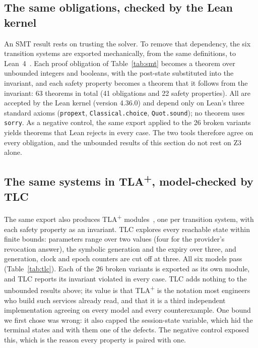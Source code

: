 \documentclass[11pt]{article}
\begin{document}
\subsection{The same obligations, checked by the Lean kernel}
\label{sec:lean}
An SMT result rests on trusting the solver. To remove that dependency, the six transition systems are exported mechanically, from the same definitions, to Lean~4~\cite{lean4}. Each proof obligation of Table~\ref{tab:smt} becomes a theorem over unbounded integers and booleans, with the post-state substituted into the invariant, and each safety property becomes a theorem that it follows from the invariant: 63 theorems in total (41 obligations and 22 safety properties). All are accepted by the Lean kernel (version 4.36.0) and depend only on Lean's three standard axioms (\texttt{propext}, \texttt{Classical.choice}, \texttt{Quot.sound}); no theorem uses \texttt{sorry}. As a negative control, the same export applied to the 26 broken variants yields theorems that Lean rejects in every case. The two tools therefore agree on every obligation, and the unbounded results of this section do not rest on Z3 alone.

\subsection{The same systems in \texorpdfstring{TLA\textsuperscript{+}}{TLA+}, model-checked by TLC}
\label{sec:tla}
The same export also produces TLA\textsuperscript{+} modules~\cite{tla}, one per transition system, with each safety property as an invariant. TLC explores every reachable state within finite bounds: parameters range over two values (four for the provider's revocation answer), the symbolic generation and the expiry over three, and generation, clock and epoch counters are cut off at three. All six models pass (Table~\ref{tab:tlc}). Each of the 26 broken variants is exported as its own module, and TLC reports its invariant violated in every case. TLC adds nothing to the unbounded results above; its value is that TLA\textsuperscript{+} is the notation most engineers who build such services already read, and that it is a third independent implementation agreeing on every model and every counterexample. One bound we first chose was wrong: it also capped the session-state variable, which hid the terminal states and with them one of the defects. The negative control exposed this, which is the reason every property is paired with one.
\end{document}
